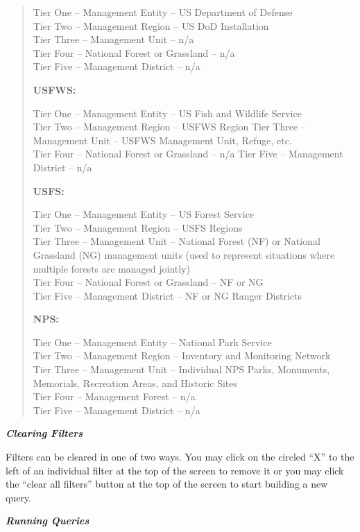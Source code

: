 \documentclass[
  letterpaper,
  DIV=11,
  numbers=noendperiod,
  oneside]{scrreprt}
\begin{document}
\begin{quote}
Tier One -- Management Entity -- US Department of Defense\\
Tier Two -- Management Region -- US DoD Installation\\
Tier Three -- Management Unit -- n/a\\
Tier Four -- National Forest or Grassland -- n/a\\
Tier Five -- Management District -- n/a

\textbf{USFWS:}

Tier One -- Management Entity -- US Fish and Wildlife Service\\
Tier Two -- Management Region -- USFWS Region Tier Three -- Management
Unit -- USFWS Management Unit, Refuge, etc.\\
Tier Four -- National Forest or Grassland -- n/a Tier Five -- Management
District -- n/a

\textbf{USFS:}

Tier One -- Management Entity -- US Forest Service\\
Tier Two -- Management Region -- USFS Regions\\
Tier Three -- Management Unit -- National Forest (NF) or National
Grassland (NG) management units (used to represent situations where
multiple forests are managed jointly)\\
Tier Four -- National Forest or Grassland -- NF or NG\\
Tier Five -- Management District -- NF or NG Ranger Districts

\textbf{NPS:}

Tier One -- Management Entity -- National Park Service\\
Tier Two -- Management Region -- Inventory and Monitoring Network\\
Tier Three -- Management Unit -- Individual NPS Parks, Monuments,
Memorials, Recreation Areas, and Historic Sites\\
Tier Four -- Management Forest -- n/a\\
Tier Five -- Management District -- n/a
\end{quote}

\textbf{\emph{Clearing Filters}}

Filters can be cleared in one of two ways. You may click on the circled
``X'' to the left of an individual filter at the top of the screen to
remove it or you may click the ``clear all filters'' button at the top
of the screen to start building a new query.

\textbf{\emph{Running Queries}}
\end{document}
